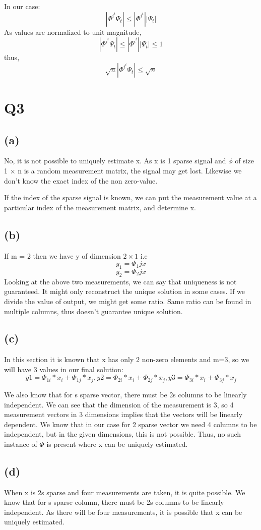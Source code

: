 \documentclass{article}
\begin{document}
In our case:
$$|\Phi^{i^t} \Psi_t| \le |\Phi^{i^t}|| \Psi_t| $$
As values are normalized to unit magnitude,
$$|\Phi^{i^t}\Psi_t| \le |\Phi^{i^t}|| \Psi_t| \le 1$$
thus, 
$$\sqrt{n}|\Phi^{i^t} \Psi_t| \le \sqrt{n} $$
\section{Q3}
\subsection{(a)}
No, it is not possible to uniquely estimate x. As x is 1 sparse signal and $\phi$ of size 1 $\times$ n is a random measurement matrix, the signal may get lost. Likewise we don't know the exact index of the non zero-value.

If the index of the sparse signal is known, we can put the measurement value at a particular index of the measurement matrix, and determine x.
\subsection{(b)}
If  m = 2 then we have y of dimension $2 \times 1$ i.e
$$y_1 = \Phi_1j x$$
$$y_2 = \Phi_2j x$$
Looking at the above two measurements, we can say that uniqueness is not guaranteed. It might only reconstruct the unique solution in some cases. If we divide the value of output, we might get some ratio. Same ratio can be found in multiple columns, thus doesn't guarantee unique solution.
\subsection{(c)}
In this section it is known that x has only 2 non-zero elements and m=3, so we will have 3 values in our final solution:
$$y1 = \Phi_{1i} * x_i + \Phi_{1j} * x_j , y2 = \Phi_{2i} * x_i + \Phi_{2j} * x_j, y3 = \Phi_{3i} * x_i + \Phi_{3j} * x_j$$

We also know that for s sparse vector, there must be 2s columns to be linearly independent.
We can see that the dimension of the measurement is 3, so 4 measurement vectors in 3 dimensions implies that the vectors will be linearly dependent.
We know that in our case for 2 sparse vector we need 4 columns to be independent, but in the given dimensions, this is not possible.
\newline
Thus, no such instance of $\Phi$ is present where x can be uniquely estimated.
\subsection{(d)}
When x is 2s sparse and four measurements are taken, it is quite possible.
We know that for s sparse column, there must be 2s columns to be linearly independent.
As there will be four measurements, it is possible that x can be uniquely estimated. 
\end{document}
